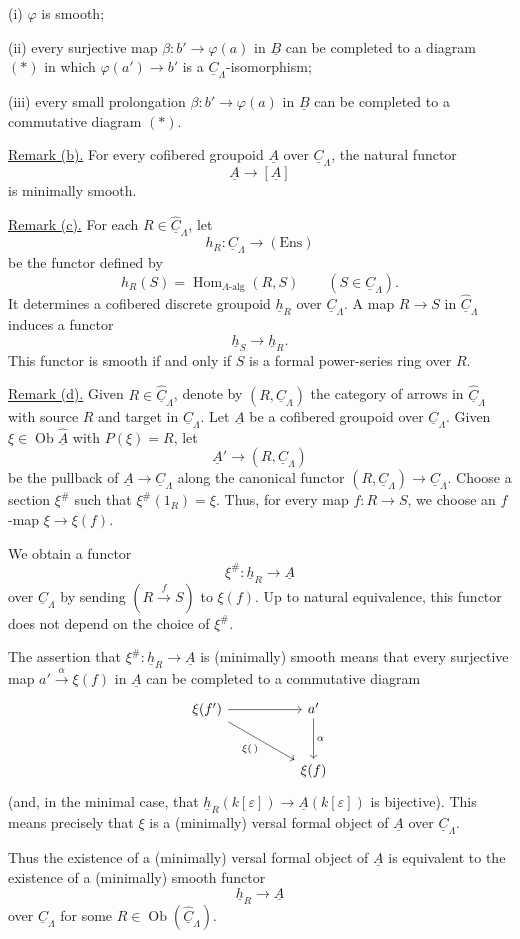 (i) $\varphi$ is smooth;

(ii) every surjective map
$\beta:b'\longrightarrow\varphi(a)$ in $\underline B$ can be
completed to a diagram $(*)$ in which
$\varphi(a')\longrightarrow b'$ is a
$\underline C_\Lambda$-isomorphism;

(iii) every small prolongation
$\beta:b'\longrightarrow\varphi(a)$ in $\underline B$ can be
completed to a commutative diagram $(*)$.

\underline{Remark (b).} For every cofibered groupoid
$\underline A$ over $\underline C_\Lambda$, the natural functor
\[
 \underline A\longrightarrow[\underline A]
\]
is minimally smooth.

\underline{Remark (c).} For each
$R\in\widehat{\underline C}_\Lambda$, let
\[
 h_R:\underline C_\Lambda\longrightarrow(\mathrm{Ens})
\]
be the functor defined by
\[
 h_R(S)=\operatorname{Hom}_{\Lambda\text{-alg}}(R,S)
 \qquad(S\in\underline C_\Lambda).
\]
It determines a cofibered discrete groupoid $\underline h_R$ over
$\underline C_\Lambda$. A map $R\longrightarrow S$ in
$\widehat{\underline C}_\Lambda$ induces a functor
\[
 \underline h_S\longrightarrow\underline h_R.
\]
This functor is smooth if and only if $S$ is a formal power-series
ring over $R$.


\underline{Remark (d).} Given
$R\in\widehat{\underline C}_\Lambda$, denote by
$(R,\underline C_\Lambda)$ the category of arrows in
$\widehat{\underline C}_\Lambda$ with source $R$ and target in
$\underline C_\Lambda$. Let $\underline A$ be a cofibered groupoid
over $\underline C_\Lambda$. Given
$\xi\in\operatorname{Ob}\widehat{\underline A}$ with $P(\xi)=R$,
let
\[
 \underline A'\longrightarrow(R,\underline C_\Lambda)
\]
be the pullback of
$\underline A\longrightarrow\underline C_\Lambda$ along the
canonical functor
$(R,\underline C_\Lambda)\longrightarrow\underline C_\Lambda$.
Choose a section $\xi^\#$ such that
$\xi^\#(1_R)=\xi$. Thus, for every map
$f:R\longrightarrow S$, we choose an $f$-map
$\xi\longrightarrow\xi(f)$.

We obtain a functor
\[
 \xi^\#:\underline h_R\longrightarrow\underline A
\]
over $\underline C_\Lambda$ by sending
$(R\xrightarrow{f}S)$ to $\xi(f)$. Up to natural equivalence, this
functor does not depend on the choice of $\xi^\#$.

The assertion that
$\xi^\#:\underline h_R\longrightarrow\underline A$ is
(minimally) smooth means that every surjective map
$a'\xrightarrow{\alpha}\xi(f)$ in $\underline A$ can be completed
to a commutative diagram
\[
\begin{tikzcd}[row sep=large,column sep=huge]
 \xi(f') \arrow[r] \arrow[dr,"{\xi(\,)}"']
 & a' \arrow[d,"\alpha"]\\
 & \xi(f)
\end{tikzcd}
\]
(and, in the minimal case, that
$\underline h_R(k[\varepsilon])\longrightarrow
\underline A(k[\varepsilon])$ is bijective). This means precisely
that $\xi$ is a (minimally) versal formal object of $\underline A$
over $\underline C_\Lambda$.

Thus the existence of a (minimally) versal formal object of
$\underline A$ is equivalent to the existence of a (minimally)
smooth functor
\[
 \underline h_R\longrightarrow\underline A
\]
over $\underline C_\Lambda$ for some
$R\in\operatorname{Ob}(\widehat{\underline C}_\Lambda)$.

